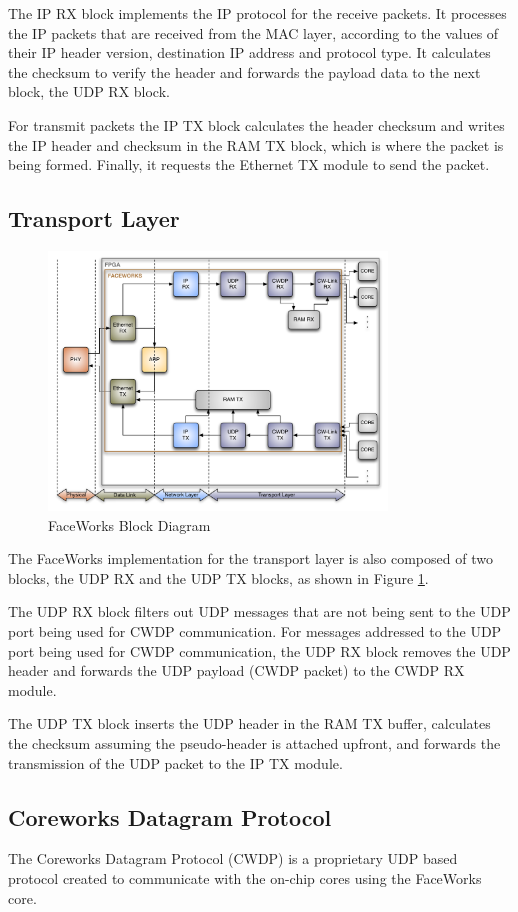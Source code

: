 \documentclass[conference]{IEEEtran}
\begin{document}
The IP RX block implements the IP protocol for the receive packets. It processes the IP packets that are received from the MAC layer, according to the values of their IP header version, destination IP address and protocol type. It calculates the checksum to verify the header and forwards the payload data to the next block, the UDP RX block.

For transmit packets the IP TX block calculates the header checksum and writes the IP header and checksum in the RAM TX block, which is where the packet is being formed. Finally, it requests the Ethernet TX module to send the packet.

\subsection{Transport Layer}
\begin{figure}[h]
  \centering
      \includegraphics[width=9cm,center]{Diagrams/FW_paper.pdf}
  \caption{FaceWorks Block Diagram}\label{fig:FW-diag}
\end{figure}

The FaceWorks implementation for the transport layer is also composed of two blocks, the UDP RX and the UDP TX blocks, as shown in Figure \ref{fig:FW-diag}.

The UDP RX block filters out UDP messages that are not being sent to the UDP port being used for CWDP communication. For messages addressed to the UDP port being used for CWDP communication, the UDP RX block removes the UDP header and forwards the UDP payload (CWDP packet) to the CWDP RX module. 

The UDP TX block inserts the UDP header in the RAM TX buffer, calculates the checksum assuming the pseudo-header is attached upfront, and forwards the transmission of the UDP packet to the IP TX module.

\subsection{Coreworks Datagram Protocol}
The Coreworks Datagram Protocol (CWDP)\cite{Facedata} is a proprietary UDP based protocol created to communicate with the on-chip cores using the FaceWorks core.
\end{document}
